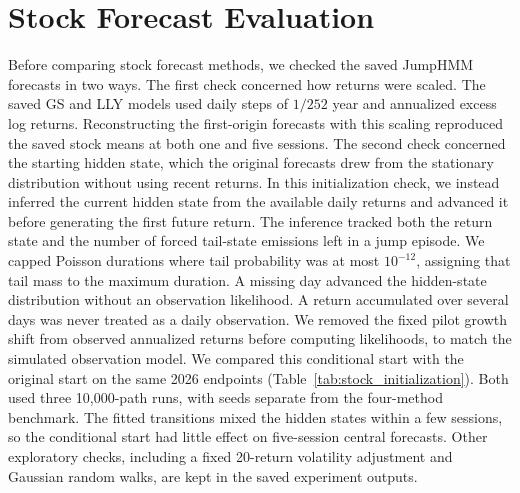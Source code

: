 \section{Stock Forecast Evaluation}\label{sec:stock_validation_supp}

Before comparing stock forecast methods, we checked the saved JumpHMM forecasts in two ways. The first check concerned how returns were scaled. The saved GS and LLY models used daily steps of $1/252$ year and annualized excess log returns. Reconstructing the first-origin forecasts with this scaling reproduced the saved stock means at both one and five sessions. The second check concerned the starting hidden state, which the original forecasts drew from the stationary distribution without using recent returns. In this initialization check, we instead inferred the current hidden state from the available daily returns and advanced it before generating the first future return. The inference tracked both the return state and the number of forced tail-state emissions left in a jump episode. We capped Poisson durations where tail probability was at most $10^{-12}$, assigning that tail mass to the maximum duration. A missing day advanced the hidden-state distribution without an observation likelihood. A return accumulated over several days was never treated as a daily observation. We removed the fixed pilot growth shift from observed annualized returns before computing likelihoods, to match the simulated observation model. We compared this conditional start with the original start on the same 2026 endpoints (Table~\ref{tab:stock_initialization}). Both used three 10{,}000-path runs, with seeds separate from the four-method benchmark. The fitted transitions mixed the hidden states within a few sessions, so the conditional start had little effect on five-session central forecasts. Other exploratory checks, including a fixed 20-return volatility adjustment and Gaussian random walks, are kept in the saved experiment outputs.

\begin{table}[H]
\centering
\caption{Stock forecast errors from the original starting state and from a starting state conditioned on past returns, on identical 2026 endpoints. Each ticker has 21 one-session and 17 five-session origins. The MAE scores the forecast median. Errors are in dollars per share and average three 10{,}000-path runs. Filtered denotes initialization from available past returns, including inference of remaining jump duration.}\label{tab:stock_initialization}
\resizebox{\textwidth}{!}{}
\end{table}

